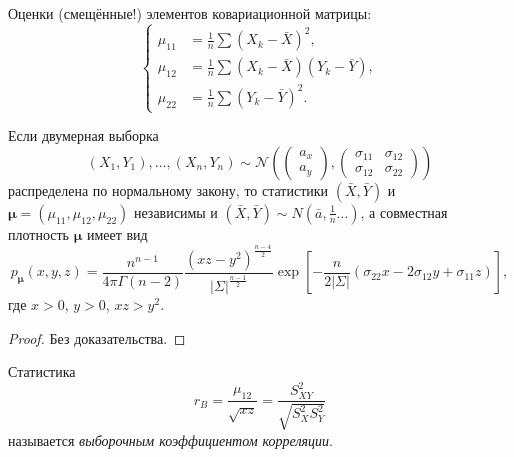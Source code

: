 Оценки (смещённые!) элементов ковариационной матрицы:
\[
\begin{cases}
  \mu_{11} &= \frac{1}{n} \sum (X_k - \bar X)^2, \\
  \mu_{12} &= \frac{1}{n} \sum (X_k - \bar X)(Y_k - \bar Y), \\ 
  \mu_{22} &= \frac{1}{n} \sum (Y_k - \bar Y)^2.
\end{cases}
\]

\begin{theorem}[Фишер]
  Если двумерная выборка
  \[
    (X_1,Y_1), \dots, (X_n, Y_n) \sim
  \mathscr N\left(
    \begin{pmatrix} a_x \\ a_y \end{pmatrix},
    \begin{pmatrix}
      \sigma_{11} & \sigma_{12} \\
      \sigma_{12} & \sigma_{22}
  \end{pmatrix} \right)
\]
распределена по нормальному закону, 
то статистики $(\bar X, \bar Y)$ и $\bm{\mu} = (\mu_{11}, \mu_{12}, \mu_{22})$ независимы и
  $(\bar X, \bar Y) \sim N( \bar a, \frac{1}{n} \dots )$, а совместная плотность
  $ \bm \mu $ имеет вид
  \[
    p_{\bm\mu} (x, y, z) = \frac{n^{n-1}}{4\pi \Gamma(n-2)} \frac{(xz -
    y^2)^\frac{n-4}{2}}{|\Sigma|^\frac{n-1}{2}} \exp\left[-\frac{n}{2 |\Sigma|}
(\sigma_{22} x - 2 \sigma_{12}y + \sigma_{11} z) \right],
\] 
где $x>0$, $y>0$, $xz>y^2$.
\end{theorem}
\begin{proof}
Без доказательства.
\end{proof}

\begin{definition}
  Статистика
  \[
    r_B = \frac{\mu_{12}}{\sqrt{xz}} = \frac{S^2_{XY}}{\sqrt{S^2_X S^2_Y}}
  \]
  называется \emph{выборочным
  коэффициентом корреляции}.
\end{definition}

